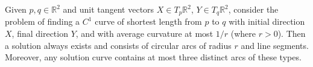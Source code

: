 Given $p, q \in \mathbb{R}^2$ and unit tangent vectors $X \in T_p\mathbb{R}^2$, $Y \in T_q\mathbb{R}^2$, consider the problem of finding a $C^1$ curve of shortest length from $p$ to $q$ with initial direction $X$, final direction $Y$, and with average curvature at most $1/r$ (where $r > 0$). Then a solution always exists and consists of circular arcs of radius $r$ and line segments. Moreover, any solution curve contains at most three distinct arcs of these types.